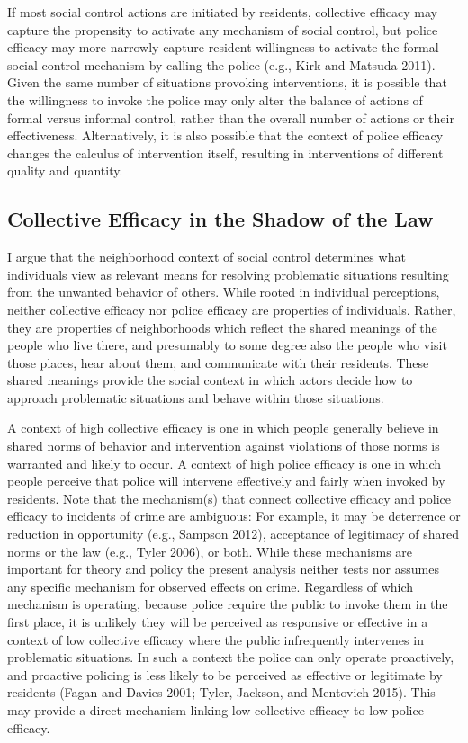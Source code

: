 \documentclass [11pt, proquest] {uwthesis}[2015/03/03]
\begin{document}
If most social control actions are initiated by residents, collective efficacy may capture the propensity to activate any mechanism of social control, but police efficacy may more narrowly capture resident willingness to activate the formal social control mechanism by calling the police (e.g., Kirk and Matsuda 2011). Given the same number of situations provoking interventions, it is possible that the willingness to invoke the police may only alter the balance of actions of formal versus informal control, rather than the overall number of actions or their effectiveness. Alternatively, it is also possible that the context of police efficacy changes the calculus of intervention itself, resulting in interventions of different quality and quantity.

\hypertarget{collective-efficacy-in-the-shadow-of-the-law}{%
\subsection{Collective Efficacy in the Shadow of the Law}\label{collective-efficacy-in-the-shadow-of-the-law}}

I argue that the neighborhood context of social control determines what individuals view as relevant means for resolving problematic situations resulting from the unwanted behavior of others. While rooted in individual perceptions, neither collective efficacy nor police efficacy are properties of individuals. Rather, they are properties of neighborhoods which reflect the shared meanings of the people who live there, and presumably to some degree also the people who visit those places, hear about them, and communicate with their residents. These shared meanings provide the social context in which actors decide how to approach problematic situations and behave within those situations.

A context of high collective efficacy is one in which people generally believe in shared norms of behavior and intervention against violations of those norms is warranted and likely to occur. A context of high police efficacy is one in which people perceive that police will intervene effectively and fairly when invoked by residents. Note that the mechanism(s) that connect collective efficacy and police efficacy to incidents of crime are ambiguous: For example, it may be deterrence or reduction in opportunity (e.g., Sampson 2012), acceptance of legitimacy of shared norms or the law (e.g., Tyler 2006), or both. While these mechanisms are important for theory and policy the present analysis neither tests nor assumes any specific mechanism for observed effects on crime. Regardless of which mechanism is operating, because police require the public to invoke them in the first place, it is unlikely they will be perceived as responsive or effective in a context of low collective efficacy where the public infrequently intervenes in problematic situations. In such a context the police can only operate proactively, and proactive policing is less likely to be perceived as effective or legitimate by residents (Fagan and Davies 2001; Tyler, Jackson, and Mentovich 2015). This may provide a direct mechanism linking low collective efficacy to low police efficacy.
\end{document}
